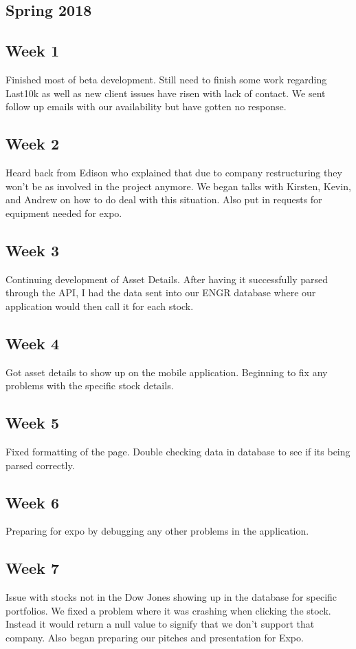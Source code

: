 \documentclass[onecolumn, draftclsnofoot,10pt, compsoc]{IEEEtran}
\begin{document}
\subsection{Spring 2018} 
    \subsection{Week 1} 
    Finished most of beta development. Still need to finish some work regarding Last10k as well as new client issues have risen with lack of contact. We sent follow up emails with our availability but have gotten no response.

    \subsection{Week 2} 
    Heard back from Edison who explained that due to company restructuring they won't be as involved in the project anymore. We began talks with Kirsten, Kevin, and Andrew on how to do deal with this situation. Also put in requests for equipment needed for expo. 

    \subsection{Week 3}
    Continuing development of Asset Details. After having it successfully parsed through the API, I had the data sent into our ENGR database where our application would then call it for each stock. 

    \subsection{Week 4} 
    Got asset details to show up on the mobile application. Beginning to fix any problems with the specific stock details.

    \subsection{Week 5} 
    Fixed formatting of the page. Double checking data in database to see if its being parsed correctly.
    
    \subsection{Week 6}
    Preparing for expo by debugging any other problems in the application. 
    
    \subsection{Week 7}
    Issue with stocks not in the Dow Jones showing up in the database for specific portfolios. We fixed a problem where it was crashing when clicking the stock. Instead it would return a null value to signify that we don't support that company. Also began preparing our pitches and presentation for Expo.
    
\end{document}
